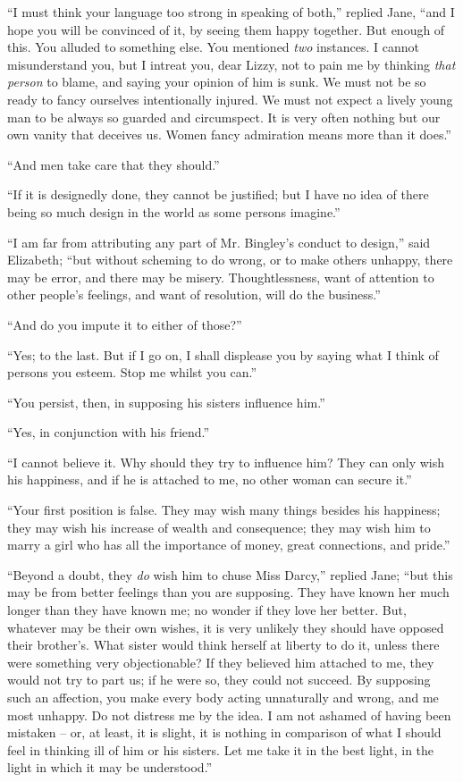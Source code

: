 “I must think your language too strong in speaking
of both,” replied Jane, “and I hope you will be convinced
of it, by seeing them happy together. But enough of this.
You alluded to something else. You mentioned \textit{two}
instances. I cannot misunderstand you, but I intreat
you, dear Lizzy, not to pain me by thinking \textit{that person}
to blame, and saying your opinion of him is sunk. We
must not be so ready to fancy ourselves intentionally
injured. We must not expect a lively young man to be
always so guarded and circumspect. It is very often
nothing but our own vanity that deceives us. Women
fancy admiration means more than it does.”

“And men take care that they should.”

“If it is designedly done, they cannot be justified;
but I have no idea of there being so much design in the
world as some persons imagine.”

“I am far from attributing any part of Mr. Bingley’s
conduct to design,” said Elizabeth; “but without
scheming to do wrong, or to make others unhappy, there
may be error, and there may be misery. Thoughtlessness,
want of attention to other people’s feelings, and want of
resolution, will do the business.”

“And do you impute it to either of those?”

“Yes; to the last. But if I go on, I shall displease
you by saying what I think of persons you esteem. Stop
me whilst you can.”

“You persist, then, in supposing his sisters influence
him.”

“Yes, in conjunction with his friend.”

“I cannot believe it. Why should they try to influence
him? They can only wish his happiness, and if he is
attached to me, no other woman can secure it.”

“Your first position is false. They may wish many
things besides his happiness; they may wish his increase
of wealth and consequence; they may wish him to marry
a girl who has all the importance of money, great connections,
and pride.”

“Beyond a doubt, they \textit{do} wish him to chuse Miss
Darcy,” replied Jane; “but this may be from better
feelings than you are supposing. They have known her
much longer than they have known me; no wonder if they
love her better. But, whatever may be their own wishes,
it is very unlikely they should have opposed their brother’s.
What sister would think herself at liberty to do it, unless
there were something very objectionable? If they believed
him attached to me, they would not try to part us; if he
were so, they could not succeed. By supposing such an
affection, you make every body acting unnaturally and
wrong, and me most unhappy. Do not distress me by the
idea. I am not ashamed of having been mistaken -- or,
at least, it is slight, it is nothing in comparison of what
I should feel in thinking ill of him or his sisters. Let me
take it in the best light, in the light in which it may be
understood.”

